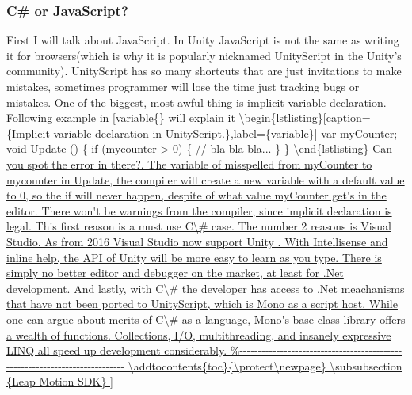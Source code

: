 \subsubsection {C\# or JavaScript?}

First I will talk about JavaScript. In Unity JavaScript is not the same as writing it for browsers(which is why it is popularly nicknamed UnityScript in the Unity's community).
UnityScript has so many shortcuts that are just invitations to make mistakes, sometimes programmer will lose the time just tracking bugs or mistakes. One of the biggest, most awful thing is implicit variable declaration. Following example in  \autoref{variable{} will explain it 

\begin{lstlisting}[caption={Implicit variable declaration in UnityScript.},label={variable}]

var myCounter;

void Update () 
    {
	 if (mycounter > 0)
	    {
	        // bla bla bla...
	    }
    }
\end{lstlisting}

Can you spot the error in there?. The variable of misspelled from myCounter to mycounter in Update, the compiler will create a new variable with a default value to 0, so the if will never happen, despite of what value myCounter get's in the editor.

There won't be warnings from the compiler, since implicit declaration is legal. This first reason is a must use C\# case.

The number 2 reasons is Visual Studio. As from 2016 Visual Studio now support Unity . With Intellisense and inline help, the API of Unity will be more easy to learn as you type. There is simply no better editor and debugger on the market, at least for .Net development.


And lastly, with C\# the developer has access to .Net meachanisms that have not been ported to UnityScript, which is Mono as a script host. While one can argue about merits of C\# as a language, Mono's base class library offers a wealth of functions. Collections, I/O, multithreading, and insanely expressive LINQ all speed up development considerably.

\addtocontents{toc}{\protect\newpage}


\subsubsection {Leap Motion SDK}
}
